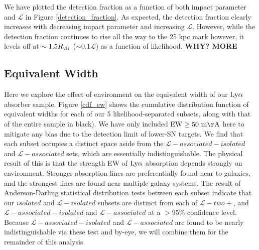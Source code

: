 \documentclass[twocolumn,tighten]{aastex62}
\begin{document}
We have plotted the detection fraction as a function of both impact parameter and $\mathcal{L}$ in Figure \ref{detection_fraction}. As expected, the detection fraction clearly increases with decreasing impact parameter and increasing $\mathcal{L}$. However, while the detection fraction continues to rise all the way to the 25 kpc mark however, it levels off at $\sim 1.5 R_{\rm vir}$ ($\sim 0.1 \mathcal{L}$) as a function of likelihood. \textbf{WHY? MORE}


\subsection{Equivalent Width}

Here we explore the effect of environment on the equivalent width of our $\rm Ly\alpha$ absorber sample. Figure \ref{cdf_ew} shows the cumulative distribution function of equivalent widths for each of our 5 likelihood-separated subsets, along with that of the entire sample in black). We have only included $\rm EW \ge 50~m\AA$ here to mitigate any bias due to the detection limit of lower-SN targets. We find that each subset occupies a distinct space aside from the $\mathcal{L}-associated-isolated$ and $\mathcal{L}-associated$ sets, which are essentially indistinguishable. The physical result of this is that the strength EW of $\rm Ly\alpha$ absorption depends strongly on environment. Stronger absorption lines are preferentially found near to galaxies, and the strongest lines are found near multiple galaxy systems. The result of Anderson-Darling statistical distribution tests between each subset indicate that our $isolated$ and $\mathcal{L}-isolated$ subsets are distinct from each of $\mathcal{L}-two+$, and $\mathcal{L}-associated-isolated$ and $\mathcal{L}-associated$ at a $>95\%$ confidence level. Because $\mathcal{L}-associated-isolated$ and $\mathcal{L}-associated$ are found to be nearly indistinguishable via these test and by-eye, we will combine them for the remainder of this analysis.
\end{document}

